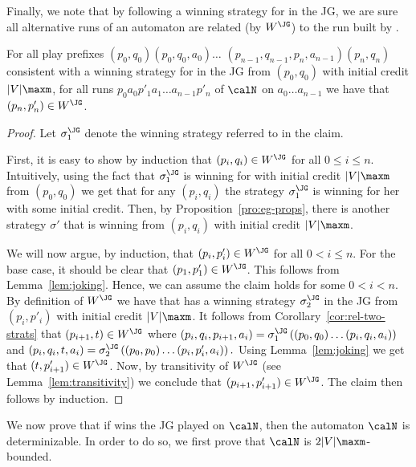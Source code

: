\documentclass[a4paper]{article}
\begin{document}
Finally, we note that by following a winning strategy for \eve in the JG, we are
sure all alternative runs of an automaton are related (by $W^{\JG}$)
to the run built by \eve.
\begin{lemma}\label{lem:good_strat}
	For all play prefixes $(p_0,q_0) (p_0,q_0,a_0) \dots$
	$(p_{n-1},q_{n-1},p_n,a_{n-1}) (p_n,q_n)$ consistent with a winning
	strategy for \eve in the JG from $(p_0,q_0)$ with initial credit
	$|V|\maxm$, for all runs $p_0 a_0 p'_1 a_1 \dots a_{n-1} p'_n$ of
	$\calN$ on $a_0 \dots a_{n-1}$ we have that $(p_n,p'_n) \in W^{\JG}$.
\end{lemma}
\begin{proof}
	Let $\sigma^{\JG}_1$ denote the winning strategy referred to in the claim.

	First, it is easy to show by induction that $(p_i,q_i) \in W^{\JG}$ for all
	$0 \le i \le n$. Intuitively, using the fact that
	$\sigma^{\JG}_1$ is winning for \eve
	with initial credit $|V|\maxm$ from $(p_0,q_0)$ we get that
	for any $(p_i,q_i)$ the strategy $\sigma^{\JG}_1$ is winning for her with
	some initial credit. Then, by Proposition~\ref{pro:eg-props}, there is
	another strategy $\sigma'$ that is winning from $(p_i,q_i)$ with initial
	credit $|V|\maxm$.

	We will now argue, by induction, that $(p_i,p'_i) \in W^{\JG}$ for all $0 <
	i \le n$. For the base case,
	it should be clear that $(p_1,p'_1) \in W^{\JG}$. This follows from
	Lemma~\ref{lem:joking}. Hence, we can assume the claim holds for some
	$0 < i < n$. By definition of $W^{\JG}$ we have that \eve has a winning
	strategy $\sigma^{\JG}_2$ in the JG from $(p_i,p'_i)$ with initial credit
	$|V|\maxm$. It follows from Corollary~\ref{cor:rel-two-strats}
	that $(p_{i+1},t) \in W^{\JG}$ where
	\(
		(p_i,q_i,p_{i+1},a_i) = 
		\sigma^{\JG}_1\left( (p_0,q_0) \dots (p_i,q_i,a_i)\right)
	\)
	and
	\(
		(p_i,q_i,t,a_i) =
		\sigma^{\JG}_2\left( (p_0,p_0) \dots (p_i,p'_i,a_i)\right).
	\)
	Using Lemma~\ref{lem:joking} we get that $(t,p'_{i+1}) \in W^{\JG}$. Now, by
	transitivity of $W^{\JG}$ (see Lemma~\ref{lem:transitivity}) we conclude
	that $(p_{i+1},p'_{i+1}) \in W^{\JG}$. The claim then follows by induction.
\end{proof}

We now prove that if \eve wins the JG played on $\calN$,
then the automaton $\calN$ is determinizable. In order to do so, we first prove that 
$\calN$ is $2|V|\maxm$-bounded.
\end{document}
